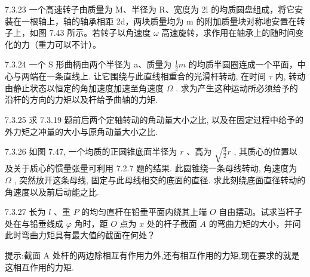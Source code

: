 \begin{problem}{7.3.23}
一个高速转子由质量为 M、半径为 R、宽度为 2l 的均质圆盘组成，将它安装在一根轴上，轴的轴承相距 2d，两块质量均为 m 的附加质量块对称地安置在转子上，如图 7.43 所示。若转子以角速度 $\omega$ 高速旋转，求作用在轴承上的随时间变化的力（重力可以不计）。
\begin{center}

\end{center}
\begin{center}

\end{center}
\end{problem}
\clearpage


\begin{problem}{7.3.24}
一个 S 形曲柄由两个半径为 a、质量为 $\frac{1}{2}m$ 的均质半圆圈连成一个平面，中心与两端在一条直线上. 让它围绕与此直线相重合的光滑杆转动, 在时间 $\tau$ 内, 转动由静止状态以恒定的角加速度加速至角速度 $\Omega$ . 求为产生这种运动所必须给予的沿杆的方向的力矩以及杆给予曲轴的力矩.
\begin{center}

\end{center}
\end{problem}
\clearpage


\begin{problem}{7.3.25}
求 7.3.19 题前后两个定轴转动的角动量大小之比, 以及在固定过程中给予的外力矩之冲量的大小与原角动量大小之比.
\end{problem}
\clearpage


\begin{problem}{7.3.26}
如图 7.47, 一个均质的正圆锥底面半径为 $r$ 、高为 $\sqrt{\frac{3}{2}} r$ , 其质心的位置以及关于质心的惯量张量可利用 7.2.7 题的结果. 此圆锥绕一条母线转动, 角速度为 $\Omega$ , 突然放开这条母线, 固定与此母线相交的底面的直径. 求此刻绕底面直径转动的角速度以及前后动能之比.
\begin{center}

\end{center}
\end{problem}
\clearpage


\begin{problem}{7.3.27}
长为 $l$ 、重 $P$ 的均匀直杆在铅垂平面内绕其上端 $O$ 自由摆动。试求当杆子处在与铅垂线成 $\varphi$ 角时，距 $O$ 点为 $x$ 处的杆子截面 $A$ 的弯曲力矩的大小，并问此时弯曲力矩具有最大值的截面在何处？

提示:截面 A 处杆的两边除相互有作用力外,还有相互作用的力矩,现在要求的就是这相互作用的力矩.
\end{problem}
\clearpage


